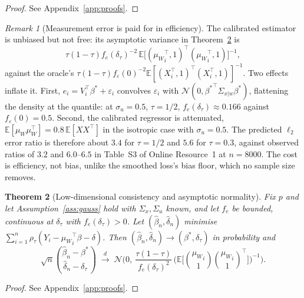 \documentclass[12pt,a4paper]{article}
\newtheorem{theorem}{Theorem}[section]
\theoremstyle{definition}
\theoremstyle{remark}
\newtheorem{remark}[theorem]{Remark}
\newcommand{\E}{\mathbb{E}}
\newcommand{\cN}{\mathcal{N}}
\newcommand{\betas}{\beta^*}
\newcommand{\muv}{\mu_W}
\newcommand{\Sxw}{\Sigma_{x|w}}
\begin{document}
\begin{proof}
See Appendix~\ref{app:proofs}.
\end{proof}

\begin{remark}[Measurement error is paid for in efficiency]
\label{rem:efficiency}
The calibrated estimator is unbiased but not free: its asymptotic variance in
Theorem~\ref{thm:lowdim} is
\[
\tau(1-\tau)f_e(\delta_\tau)^{-2}\,\E\big[({\muv}_i^\top,1)^\top({\muv}_i^\top,1)\big]^{-1},
\]
against the oracle's
$\tau(1-\tau)f_\varepsilon(0)^{-2}\E[(X_i^\top,1)^\top(X_i^\top,1)]^{-1}$.
Two effects inflate it. First, $e_i = V_i^\top\betas+\varepsilon_i$ convolves
$\varepsilon_i$ with $\cN(0,{\betas}^\top\Sxw\betas)$, flattening the density at the
quantile: at $\sigma_u=0.5$, $\tau=1/2$, $f_e(\delta_\tau)\approx0.166$ against
$f_\varepsilon(0)=0.5$. Second, the calibrated regressor is attenuated,
$\E[\muv\muv^\top] = 0.8\,\E[XX^\top]$ in the isotropic case with $\sigma_u=0.5$. The
predicted $\ell_2$ error ratio is therefore about $3.4$ for $\tau=1/2$ and $5.6$ for
$\tau=0.3$, against observed ratios of $3.2$ and $6.0$--$6.5$ in
Table~S3 of Online Resource~1 at $n=8000$. The cost is efficiency, not bias, unlike the
smoothed loss's bias floor, which no sample size removes.
\end{remark}

\begin{theorem}[Low-dimensional consistency and asymptotic normality]
\label{thm:lowdim}
Fix $p$ and let Assumption~\ref{ass:gauss} hold with $\Sigma_x,\Sigma_u$ known, and let
$f_e$ be bounded, continuous at $\delta_\tau$ with $f_e(\delta_\tau)>0$. Let
$(\hat\beta_n,\hat\delta_n)$ minimise $\sum_{i=1}^n\rho_\tau(Y_i-{\muv}_i^\top\beta-\delta)$.
Then $(\hat\beta_n,\hat\delta_n)\to(\betas,\delta_\tau)$ in probability and
\begin{equation}
\sqrt{n}\binom{\hat\beta_n-\betas}{\hat\delta_n-\delta_\tau}
\;\xrightarrow{\ d\ }\;
\cN\Big(0,\ \frac{\tau(1-\tau)}{f_e(\delta_\tau)^2}\,
\Big(\E\Big[\binom{{\muv}_i}{1}\binom{{\muv}_i}{1}^{\!\top}\Big]\Big)^{-1}\Big).
\end{equation}
\end{theorem}

\begin{proof}
See Appendix~\ref{app:proofs}.
\end{proof}
\end{document}
